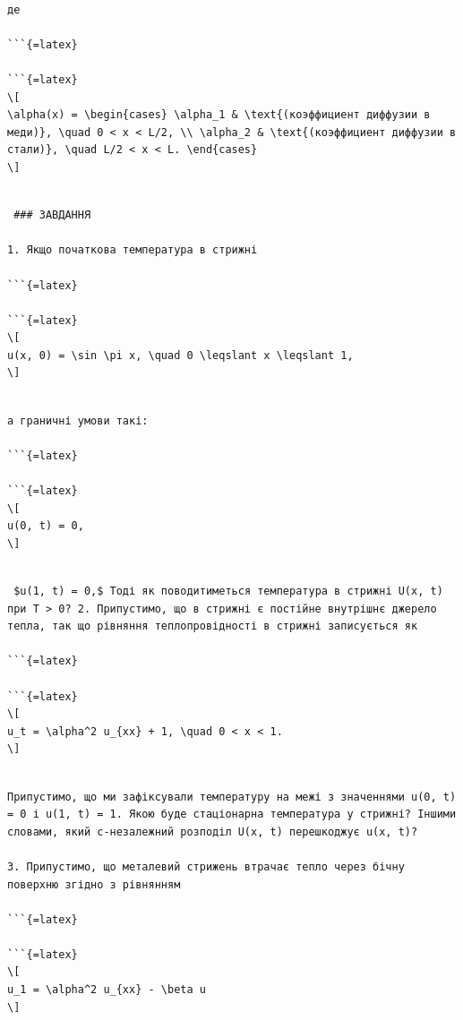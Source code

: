 \documentclass[
  ukrainian,
]{article}
\begin{document}
\begin{verbatim}

де 

```{=latex}

```{=latex}
\[
\alpha(x) = \begin{cases} \alpha_1 & \text{(коэффициент диффузии в меди)}, \quad 0 < x < L/2, \\ \alpha_2 & \text{(коэффициент диффузии в стали)}, \quad L/2 < x < L. \end{cases}
\]
\end{verbatim}

\begin{verbatim}

 ### ЗАВДАННЯ

1. Якщо початкова температура в стрижні

```{=latex}

```{=latex}
\[
u(x, 0) = \sin \pi x, \quad 0 \leqslant x \leqslant 1,
\]
\end{verbatim}

\begin{verbatim}

а граничні умови такі:

```{=latex}

```{=latex}
\[
u(0, t) = 0,
\]
\end{verbatim}

\begin{verbatim}

 $u(1, t) = 0,$ Тоді як поводитиметься температура в стрижні U(x, t) при T > 0? 2. Припустимо, що в стрижні є постійне внутрішнє джерело тепла, так що рівняння теплопровідності в стрижні записується як

```{=latex}

```{=latex}
\[
u_t = \alpha^2 u_{xx} + 1, \quad 0 < x < 1.
\]
\end{verbatim}

\begin{verbatim}

Припустимо, що ми зафіксували температуру на межі з значеннями u(0, t) = 0 і u(1, t) = 1. Якою буде стаціонарна температура у стрижні? Іншими словами, який c-незалежний розподіл U(x, t) перешкоджує u(x, t)?

3. Припустимо, що металевий стрижень втрачає тепло через бічну поверхню згідно з рівнянням

```{=latex}

```{=latex}
\[
u_1 = \alpha^2 u_{xx} - \beta u
\]
\end{verbatim}
\end{document}
